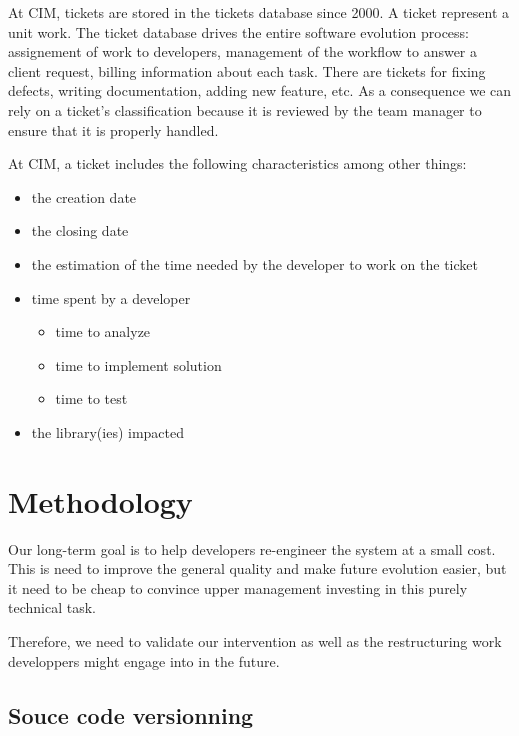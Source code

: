 \documentclass[10pt,conference]{IEEEtran}
\begin{document}
At CIM, tickets are stored in the tickets database since 2000.
A ticket represent a unit work.
The ticket database drives the entire software evolution process: assignement of work to developers, management of the workflow to answer a client request, billing information about each task.
There are tickets for fixing defects, writing documentation, adding new feature, etc. 
As a consequence we can rely on a ticket's classification because it is reviewed by the team manager to ensure that it is properly handled.

At CIM, a ticket includes the following characteristics among other things:

\begin{itemize}
\item the creation date
\item the closing date
\item the estimation of the time needed by the developer to work on the ticket
\item time spent by a developer
  \begin{itemize}
  \item time to analyze
  \item time to implement solution
  \item time to test
  \end{itemize}
  \item the library(ies) impacted
\end{itemize}

\section{Methodology}
\label{sec:methodology}

Our long-term goal is to help developers re-engineer the system at a small cost.
This is need to improve the general quality and make future evolution easier, but it need to be cheap to convince upper management investing in this purely technical task.

Therefore, we need to validate our intervention as well as the restructuring work developpers might engage into in the future.

\subsection{Souce code versionning}
\end{document}
